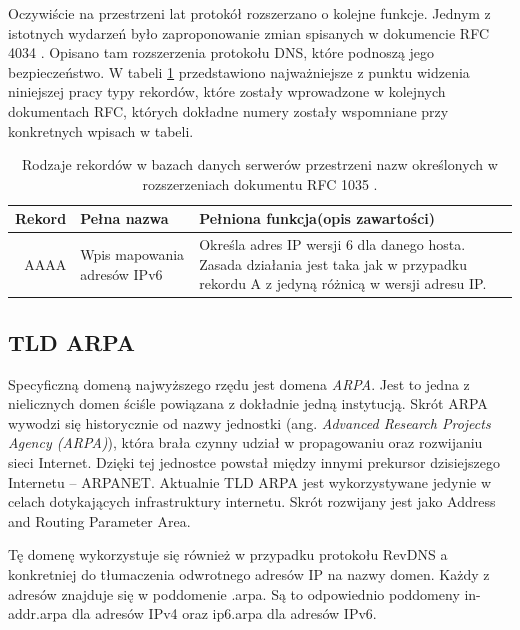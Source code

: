 Oczywiście na przestrzeni lat protokół rozszerzano o kolejne funkcje. Jednym z istotnych wydarzeń było zaproponowanie zmian
spisanych w dokumencie RFC 4034 \cite{RFC4034}. Opisano tam rozszerzenia protokołu DNS, które podnoszą jego bezpieczeństwo.
W tabeli \ref{typyRekordowDnsExt} przedstawiono najważniejsze z punktu widzenia niniejszej pracy typy rekordów, które zostały
wprowadzone w kolejnych dokumentach RFC, których dokładne numery zostały wspomniane przy konkretnych wpisach w tabeli.

\begin{table}[]
	\centering
	\caption{Rodzaje rekordów w bazach danych serwerów przestrzeni nazw określonych w rozszerzeniach dokumentu RFC 1035 \cite{RFC1035}.}
	\label{typyRekordowDnsExt}
	\begin{tabular}{|r|p{3cm}|p{8cm}|}
		\hline
		\textbf{Rekord} &
		\textbf{Pełna nazwa} &
		\textbf{Pełniona funkcja(opis zawartości)} \\
		\hline\hline
			AAAA &
			Wpis mapowania adresów IPv6 &
			Określa adres IP wersji 6 dla danego hosta. Zasada działania jest taka jak w przypadku rekordu A z jedyną różnicą
			w wersji adresu IP. \\
		\hline
	\end{tabular}
\end{table}

\subsection{TLD ARPA}
Specyficzną domeną najwyższego rzędu jest domena \textit{ARPA}. Jest to jedna z nielicznych domen ściśle powiązana z dokładnie jedną
instytucją. Skrót ARPA wywodzi się historycznie od nazwy jednostki (ang. \textit{Advanced Research Projects Agency (ARPA)}), która
brała czynny udział w propagowaniu oraz rozwijaniu sieci Internet. Dzięki tej jednostce powstał między innymi prekursor dzisiejszego
Internetu -- ARPANET. Aktualnie TLD ARPA jest wykorzystywane jedynie w celach dotykających infrastruktury internetu. Skrót rozwijany jest
jako Address and Routing Parameter Area.

Tę domenę wykorzystuje się również w przypadku protokołu RevDNS a konkretniej do tłumaczenia
odwrotnego adresów IP na nazwy domen. Każdy z adresów znajduje się w poddomenie .arpa. Są to odpowiednio poddomeny in-addr.arpa dla
adresów IPv4 oraz ip6.arpa dla adresów IPv6.

